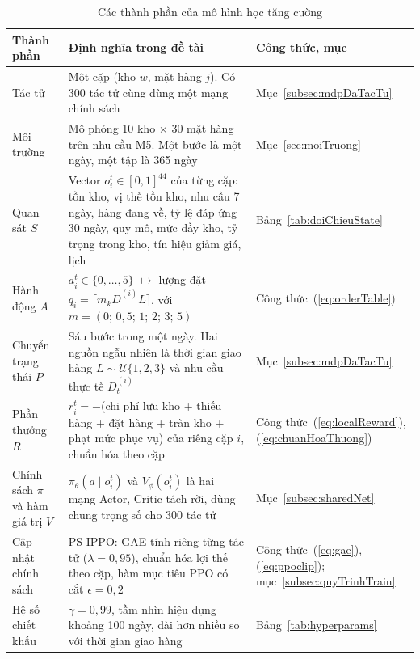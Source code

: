\begin{table}[htbp]
    \centering
    \caption{Các thành phần của mô hình học tăng cường}
    \label{tab:anhXaMDP}
    \small
    \begin{tabular}{|>{\raggedright\arraybackslash}p{2.5cm}|>{\raggedright\arraybackslash}p{8.6cm}|>{\raggedright\arraybackslash}p{2.9cm}|}
        \hline
        Thành phần & Định nghĩa trong đề tài & Công thức, mục \\
        \hline
        Tác tử & Một cặp (kho $w$, mặt hàng $j$). Có 300 tác tử cùng dùng một mạng chính sách & Mục~\ref{subsec:mdpDaTacTu} \\ \hline
        Môi trường & Mô phỏng 10 kho $\times$ 30 mặt hàng trên nhu cầu M5. Một bước là một ngày, một tập là 365 ngày & Mục~\ref{sec:moiTruong} \\ \hline
        Quan sát $S$ & Vector $o_i^t \in [0,1]^{44}$ của từng cặp: tồn kho, vị thế tồn kho, nhu cầu 7 ngày, hàng đang về, tỷ lệ đáp ứng 30 ngày, quy mô, mức đầy kho, tỷ trọng trong kho, tín hiệu giảm giá, lịch & Bảng~\ref{tab:doiChieuState} \\ \hline
        Hành động $A$ & $a_i^t \in \{0,\dots,5\}$ $\mapsto$ lượng đặt $q_i = \lceil m_k \bar{D}^{(i)} \bar{L} \rceil$, với $m = (0;\,0{,}5;\,1;\,2;\,3;\,5)$ & Công thức~(\ref{eq:orderTable}) \\ \hline
        Chuyển trạng thái $P$ & Sáu bước trong một ngày. Hai nguồn ngẫu nhiên là thời gian giao hàng $L \sim \mathcal{U}\{1,2,3\}$ và nhu cầu thực tế $D_t^{(i)}$ & Mục~\ref{subsec:mdpDaTacTu} \\ \hline
        Phần thưởng $R$ & $r_i^t = -$(chi phí lưu kho + thiếu hàng + đặt hàng + tràn kho + phạt mức phục vụ) của riêng cặp $i$, chuẩn hóa theo cặp & Công thức~(\ref{eq:localReward}), (\ref{eq:chuanHoaThuong}) \\ \hline
        Chính sách $\pi$ và hàm giá trị $V$ & $\pi_\theta(a \mid o_i^t)$ và $V_\phi(o_i^t)$ là hai mạng Actor, Critic tách rời, dùng chung trọng số cho 300 tác tử & Mục~\ref{subsec:sharedNet} \\ \hline
        Cập nhật chính sách & PS-IPPO: GAE tính riêng từng tác tử ($\lambda = 0{,}95$), chuẩn hóa lợi thế theo cặp, hàm mục tiêu PPO có cắt $\epsilon = 0{,}2$ & Công thức~(\ref{eq:gae}), (\ref{eq:ppoclip}); mục~\ref{subsec:quyTrinhTrain} \\ \hline
        Hệ số chiết khấu & $\gamma = 0{,}99$, tầm nhìn hiệu dụng khoảng 100 ngày, dài hơn nhiều so với thời gian giao hàng & Bảng~\ref{tab:hyperparams} \\
        \hline
    \end{tabular}
\end{table}

